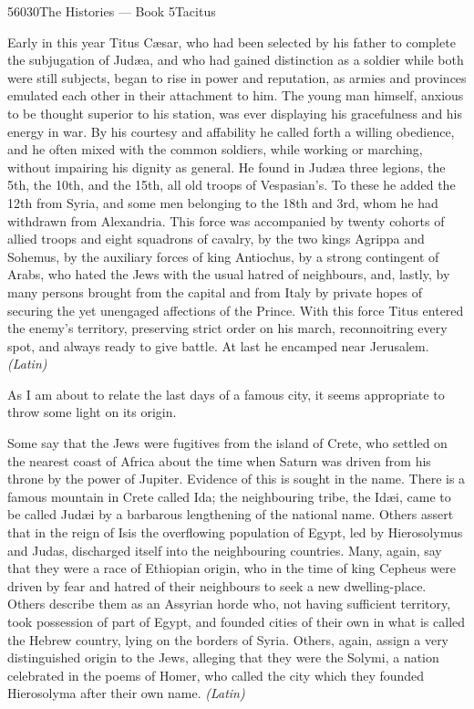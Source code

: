 56030The Histories — Book 5Tacitus


Early in this year Titus Cæsar, who had been selected by his father to complete the subjugation of Judæa, and who had gained distinction as a soldier while both were still subjects, began to rise in power and reputation, as armies and provinces emulated each other in their attachment to him. The young man himself, anxious to be thought superior to his station, was ever displaying his gracefulness and his energy in war. By his courtesy and affability he called forth a willing obedience, and he often mixed with the common soldiers, while working or marching, without impairing his dignity as general. He found in Judæa three legions, the 5th, the 10th, and the 15th, all old troops of Vespasian's. To these he added the 12th from Syria, and some men belonging to the 18th and 3rd, whom he had withdrawn from Alexandria. This force was accompanied by twenty cohorts of allied troops and eight squadrons of cavalry, by the two kings Agrippa and Sohemus, by the auxiliary forces of king Antiochus, by a strong contingent of Arabs, who hated the Jews with the usual hatred of neighbours, and, lastly, by many persons brought from the capital and from Italy by private hopes of securing the yet unengaged affections of the Prince. With this force Titus entered the enemy's territory, preserving strict order on his march, reconnoitring every spot, and always ready to give battle. At last he encamped near Jerusalem. \emph{(Latin)}


As I am about to relate the last days of a famous city, it seems appropriate to throw some light on its origin.

Some say that the Jews were fugitives from the island of Crete, who settled on the nearest coast of Africa about the time when Saturn was driven from his throne by the power of Jupiter. Evidence of this is sought in the name. There is a famous mountain in Crete called Ida; the neighbouring tribe, the Idæi, came to be called Judæi by a barbarous lengthening of the national name. Others assert that in the reign of Isis the overflowing population of Egypt, led by Hierosolymus and Judas, discharged itself into the neighbouring countries. Many, again, say that they were a race of Ethiopian origin, who in the time of king Cepheus were driven by fear and hatred of their neighbours to seek a new dwelling-place. Others describe them as an Assyrian horde who, not having sufficient territory, took possession of part of Egypt, and founded cities of their own in what is called the Hebrew country, lying on the borders of Syria. Others, again, assign a very distinguished origin to the Jews, alleging that they were the Solymi, a nation celebrated in the poems of Homer, who called the city which they founded Hierosolyma after their own name. \emph{(Latin)}

